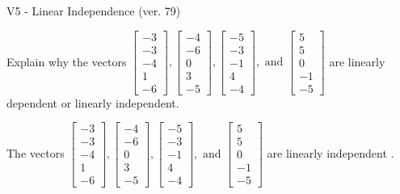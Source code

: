 \begin{exercise}
  \begin{exerciseTitle}V5 - Linear Independence (ver. 79)\end{exerciseTitle}
  \begin{exerciseStatement}
    Explain why the vectors \(\left[\begin{array}{r}
-3 \\
-3 \\
-4 \\
1 \\
-6
\end{array}\right] , \left[\begin{array}{r}
-4 \\
-6 \\
0 \\
3 \\
-5
\end{array}\right] , \left[\begin{array}{r}
-5 \\
-3 \\
-1 \\
4 \\
-4
\end{array}\right] , \text{ and } \left[\begin{array}{r}
5 \\
5 \\
0 \\
-1 \\
-5
\end{array}\right]\) are linearly dependent or linearly independent.	


  \end{exerciseStatement}
  \begin{exerciseAnswer}
   The vectors \(\left[\begin{array}{r}
-3 \\
-3 \\
-4 \\
1 \\
-6
\end{array}\right] , \left[\begin{array}{r}
-4 \\
-6 \\
0 \\
3 \\
-5
\end{array}\right] , \left[\begin{array}{r}
-5 \\
-3 \\
-1 \\
4 \\
-4
\end{array}\right] , \text{ and } \left[\begin{array}{r}
5 \\
5 \\
0 \\
-1 \\
-5
\end{array}\right]\) are 
  	 linearly independent  .
  


  \end{exerciseAnswer}
\end{exercise}